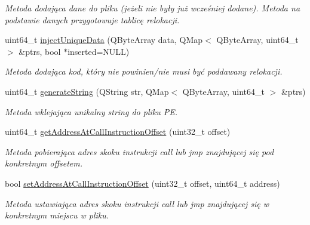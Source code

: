 \begin{DoxyCompactItemize}
\begin{DoxyCompactList}\small\item\em Metoda dodająca dane do pliku (jeżeli nie były już wcześniej dodane). Metoda na podstawie danych przygotowuje tablicę relokacji. \end{DoxyCompactList}\item 
uint64\-\_\-t \hyperlink{class_p_e_file_a6bea21405c1aab9b4e3d43d980a5aac5}{inject\-Unique\-Data} (Q\-Byte\-Array data, Q\-Map$<$ Q\-Byte\-Array, uint64\-\_\-t $>$ \&ptrs, bool $\ast$inserted=N\-U\-L\-L)
\begin{DoxyCompactList}\small\item\em Metoda dodająca kod, który nie powinien/nie musi być poddawany relokacji. \end{DoxyCompactList}\item 
uint64\-\_\-t \hyperlink{class_p_e_file_a2dca67d21245ba63171ee34456456f96}{generate\-String} (Q\-String str, Q\-Map$<$ Q\-Byte\-Array, uint64\-\_\-t $>$ \&ptrs)
\begin{DoxyCompactList}\small\item\em Metoda wklejająca unikalny string do pliku P\-E. \end{DoxyCompactList}\item 
uint64\-\_\-t \hyperlink{class_p_e_file_a1cf0f58cf7e061011a1dd95b16076e07}{get\-Address\-At\-Call\-Instruction\-Offset} (uint32\-\_\-t offset)
\begin{DoxyCompactList}\small\item\em Metoda pobierająca adres skoku instrukcji call lub jmp znajdującej się pod konkretnym offsetem. \end{DoxyCompactList}\item 
bool \hyperlink{class_p_e_file_a6c06d44bec906ab659326541e6244850}{set\-Address\-At\-Call\-Instruction\-Offset} (uint32\-\_\-t offset, uint64\-\_\-t address)
\begin{DoxyCompactList}\small\item\em Metoda ustawiająca adres skoku instrukcji call lub jmp znajdującej się w konkretnym miejscu w pliku. \end{DoxyCompactList}\end{DoxyCompactItemize}
